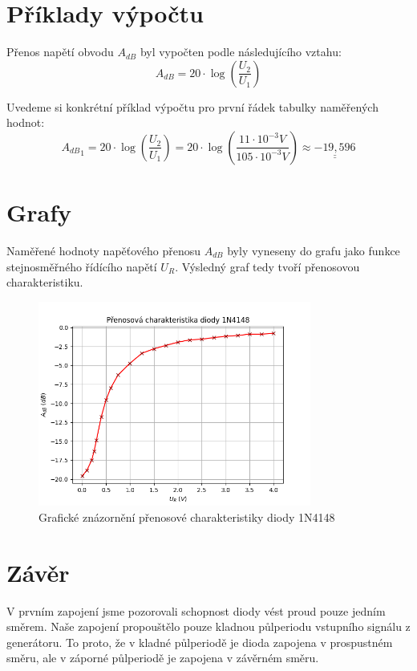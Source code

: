 \documentclass[a4paper, czech]{article}
\begin{document}
\newpage

\section{Příklady výpočtu}
Přenos napětí obvodu $A_{dB}$ byl vypočten podle následujícího vztahu:
$$A_{dB}=20 \cdot \log\left(\frac{U_2}{U_1}\right)$$

Uvedeme si konkrétní příklad výpočtu pro první řádek tabulky naměřených hodnot:
$${A_{dB}}_1 = 20 \cdot \log\left(\frac{U_2}{U_1}\right) = 20 \cdot \log\left(\frac{11 \cdot 10^{-3}V}{105 \cdot 10^{-3}V}\right) \approx \underline{\underline{-19,596}}$$

\section{Grafy}

Naměřené hodnoty napěťového přenosu $A_{dB}$ byly vyneseny do grafu jako funkce stejnosměřného řídícího napětí $U_R$. Výsledný graf tedy tvoří přenosovou charakteristiku.

\begin{figure}[H]
    \centering
    \includegraphics[width=0.8\textwidth]{graf.png}
    \caption{Grafické znázornění přenosové charakteristiky diody 1N4148}
\end{figure}

\section{Závěr}

V prvním zapojení jsme pozorovali schopnost diody vést proud pouze jedním směrem. Naše zapojení propouštělo pouze kladnou půlperiodu vstupního signálu z generátoru. To proto, že v kladné půlperiodě je dioda zapojena v prospustném směru, ale v záporné půlperiodě je zapojena v závěrném směru.
\end{document}
